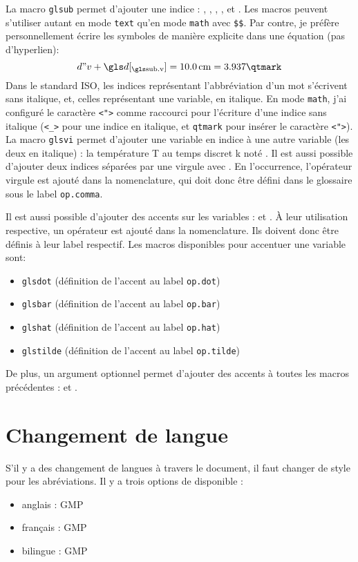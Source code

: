\documentclass[PhD,nohyperref,english,french]{ulthese}
\begin{document}
La macro \texttt{glsub} permet d'ajouter une indice : , , , ,  et . Les macros peuvent s'utiliser autant en mode \texttt{text} qu'en mode \texttt{math} avec \texttt{\$\$}. Par contre, je préfère personnellement écrire les symboles de manière explicite dans une équation (pas d'hyperlien):
\begin{equation}
d"v + \glsub{d}{v} = \SI{10.0}{\centi\meter} = 3.937\qtmark
\end{equation}
Dans le standard ISO, les indices représentant l'abbréviation d'un mot s'écrivent sans italique, et, celles représentant une variable, en italique. En mode \texttt{math}, j'ai configuré le caractère \texttt{<">} comme raccourci pour l'écriture d'une indice sans italique (\texttt{<\_>} pour une indice en italique, et \texttt{qtmark} pour insérer le caractère \texttt{<">}). La macro \texttt{glsvi} permet d'ajouter une variable en indice à une autre variable (les deux en italique) : la température \gls{T} au temps discret \gls{k} noté . Il est aussi possible d'ajouter deux indices séparées par une virgule avec . En l’occurrence, l'opérateur virgule est ajouté dans la nomenclature, qui doit donc être défini dans le glossaire sous le label \texttt{op.comma}.

Il est aussi possible d'ajouter des accents sur les variables :  et . À leur utilisation respective, un opérateur est ajouté dans la nomenclature. Ils doivent donc être définis à leur label respectif. Les macros disponibles pour accentuer une variable sont:
\begin{itemize} 
	\item \texttt{glsdot} (définition de l'accent au label \texttt{op.dot})
	\item \texttt{glsbar} (définition de l'accent au label \texttt{op.bar})
	\item \texttt{glshat} (définition de l'accent au label \texttt{op.hat})
	\item \texttt{glstilde} (définition de l'accent au label \texttt{op.tilde})
\end{itemize}
De plus, un argument optionnel permet d'ajouter des accents à toutes les macros précédentes :  et . 

\section{Changement de langue}

S'il y a des changement de langues à travers le document, il faut changer de style pour les abréviations. Il y a trois options de disponible : 

\begin{itemize}
 \item anglais : \acrfull{GMP} 
  \item français : \acrfull{GMP} 
 \item bilingue : \acrfull{GMP}  
\end{itemize}
\end{document}

